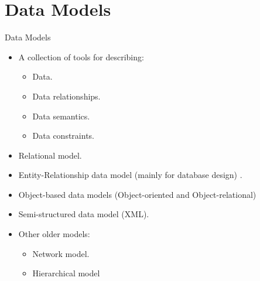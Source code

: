 \documentclass{beamer}
\begin{document}
\section{Data Models}
\begin{frame}{Data Models}
    \begin{itemize}
        \item A collection of tools for describing:
        \begin{itemize}
            \item Data.
            \item Data relationships.
            \item Data semantics.
            \item Data constraints.
        \end{itemize}
        \item Relational model.
        \item Entity-Relationship data model (mainly for database design) .
        \item Object-based data models (Object-oriented and Object-relational)
        \item Semi-structured data model  (XML).
        \item Other older models:
        \begin{itemize}
            \item Network model.
            \item Hierarchical model
        \end{itemize}
    \end{itemize}
\end{frame}
\end{document}
